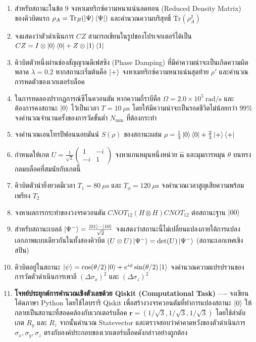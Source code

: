\begin{enumerate}[label=\textbf{\arabic*.}]
    \item สำหรับสถานะในข้อ 9 จงหาเมทริกซ์ความหนาแน่นลดทอน (Reduced Density Matrix) ของคิวบิตแรก $\rho_A = \text{Tr}_B(\ket{\Psi}\bra{\Psi})$ และคำนวณความบริสุทธิ์ $\text{Tr}(\rho_A^2)$
    \item จงแสดงว่าตัวดำเนินการ $CZ$ สามารถเขียนในรูปของโปรเจกเตอร์ได้เป็น $CZ = I \otimes \ket{0}\bra{0} + Z \otimes \ket{1}\bra{1}$
    \item คิวบิตตัวหนึ่งผ่านช่องสัญญาณดีเฟสซิง (Phase Damping) ที่มีค่าความน่าจะเป็นเกิดความผิดพลาด $\lambda = 0.2$ หากสถานะเริ่มต้นคือ $\ket{+}$ จงหาเมทริกซ์ความหนาแน่นสุดท้าย $\rho'$ และคำนวณการหดตัวของเวกเตอร์บล็อค
    \item ในการทดลองปรากฏการณ์ซีโนควอนตัม หากความถี่ราบีคือ $\Omega = 2.0 \times 10^5~\text{rad/s}$ และต้องการคงสถานะ $\ket{0}$ ไว้เป็นเวลา $T = 10~\mu\text{s}$ โดยให้มีความน่าจะเป็นรอดชีวิตไม่น้อยกว่า $99\%$ จงคำนวณจำนวนครั้งของการวัดขั้นต่ำ $N_{\text{min}}$ ที่ต้องกระทำ
    \item จงคำนวณเอนโทรปีฟอนนอยมันน์ $S(\rho)$ ของสถานะผสม $\rho = \frac{1}{3}\ket{0}\bra{0} + \frac{2}{3}\ket{+}\bra{+}$
    \item กำหนดให้เกต $U = \frac{1}{\sqrt{2}}\begin{pmatrix} 1 & -i \\ -i & 1 \end{pmatrix}$ จงหาแกนหมุนหนึ่งหน่วย $\hat{\mathbf{n}}$ และมุมการหมุน $\theta$ บนทรงกลมบล็อคที่สมนัยกับเกตนี้
    \item คิวบิตตัวนำยิ่งยวดมีเวลา $T_1 = 80~\mu\text{s}$ และ $T_\phi = 120~\mu\text{s}$ จงคำนวณเวลาสูญเสียความพร้อมเพรียง $T_2$
    \item จงหาผลการกระทำของวงจรควอนตัม $CNOT_{12} (H \otimes H) CNOT_{12}$ ต่อสถานะฐาน $\ket{00}$
    \item สำหรับสถานะเบลล์ $\ket{\Psi^-} = \frac{\ket{01}-\ket{10}}{\sqrt{2}}$ จงแสดงว่าสถานะนี้ไม่เปลี่ยนแปลงภายใต้การแปลงเอกภาพแบบเดียวกันในทั้งสองคิวบิต $(U \otimes U)\ket{\Psi^-} = \det(U)\ket{\Psi^-}$ (สถานะเอกเทศเชิงสปิน)
    \item คิวบิตอยู่ในสถานะ $\ket{\psi} = \cos(\theta/2)\ket{0} + e^{i\phi}\sin(\theta/2)\ket{1}$ จงคำนวณความแปรปรวนของการวัดตัวดำเนินการเพาลี $(\Delta \sigma_x)^2$ และ $(\Delta \sigma_z)^2$
    \item \textbf{โจทย์ประยุกต์การคำนวณเชิงตัวเลขด้วย Qiskit (Computational Task)} ---- จงเขียนโค้ดภาษา Python โดยใช้ไลบรารี Qiskit เพื่อสร้างวงจรควอนตัมที่ทำการแปลงสถานะ $\ket{0}$ ให้กลายเป็นสถานะที่สอดคล้องกับเวกเตอร์บล็อค $\mathbf{r} = (1/\sqrt{3}, 1/\sqrt{3}, 1/\sqrt{3})$ โดยใช้ลำดับเกต $R_y$ และ $R_z$ จากนั้นคำนวณ Statevector และตรวจสอบว่าค่าคาดหวังของตัวดำเนินการ $\sigma_x, \sigma_y, \sigma_z$ ตรงกับองค์ประกอบของเวกเตอร์บล็อคดังกล่าวอย่างถูกต้อง
\end{enumerate}
